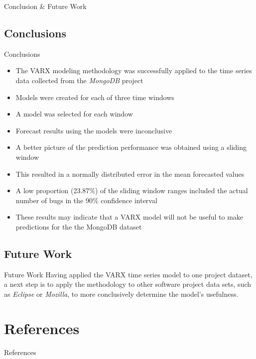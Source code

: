 \documentclass[presentation]{beamer}
\begin{document}
\begin{frame}
\begin{center}
\Large{Conclusion \& Future Work}
\end{center}
\end{frame}

\subsection{Conclusions}

\begin{frame}[t]{Conclusions}
\footnotesize{
\begin{itemize}
\item{The VARX modeling methodology was successfully applied to the time series data collected from the \textit{MongoDB} project}
\item{Models were created for each of three time windows}
\item{A model was selected for each window}
\item{Forecast results using the models were inconclusive}
\item{A better picture of the prediction performance was obtained using a sliding window}
\item{This resulted in a normally distributed error in the mean forecasted values}
\item{A low proportion (23.87\%) of the sliding window ranges included the actual number of bugs in the 90\% confidence interval}
\item{These results may indicate that a VARX model will not be useful to make predictions for the the MongoDB dataset}
\end{itemize}
}
\end{frame}

\subsection{Future Work}

\begin{frame}{Future Work}
Having applied the VARX time series model to one project dataset, a next step is to apply the methodology to other software project data sets, such as \textit{Eclipse} or \textit{Mozilla}, to more conclusively determine the model's usefulness.
\end{frame}

\section{References}

\begin{frame}[allowframebreaks]{References}
\begin{center}


\end{center}
\end{frame}
\end{document}
